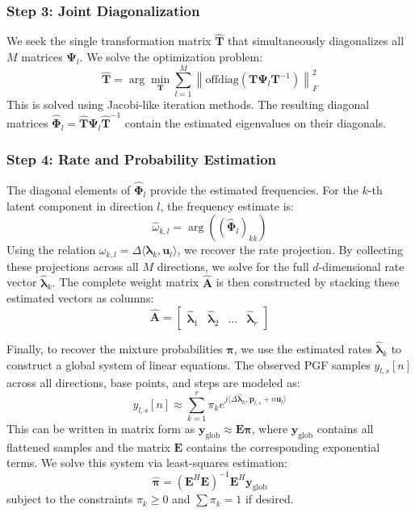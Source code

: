 \subsubsection{Step 3: Joint Diagonalization}
We seek the single transformation matrix $\hat{\mathbf{T}}$ that simultaneously diagonalizes all $M$ matrices $\mathbf{\Psi}_l$. We solve the optimization problem:
$$ \hat{\mathbf{T}} = \arg\min_{\mathbf{T}} \sum_{l=1}^M \left\| \text{offdiag}(\mathbf{T} \mathbf{\Psi}_l \mathbf{T}^{-1}) \right\|_F^2 $$
This is solved using Jacobi-like iteration methods. The resulting diagonal matrices $\hat{\mathbf{\Phi}}_l = \hat{\mathbf{T}} \mathbf{\Psi}_l \hat{\mathbf{T}}^{-1}$ contain the estimated eigenvalues on their diagonals.

\subsubsection{Step 4: Rate and Probability Estimation}
The diagonal elements of $\hat{\mathbf{\Phi}}_l$ provide the estimated frequencies. For the $k$-th latent component in direction $l$, the frequency estimate is:
$$ \hat{\omega}_{k,l} = \arg( (\hat{\mathbf{\Phi}}_l)_{kk} ) $$
Using the relation $\omega_{k,l} = \Delta \langle \boldsymbol{\lambda}_k, \mathbf{u}_l \rangle$, we recover the rate projection. By collecting these projections across all $M$ directions, we solve for the full $d$-dimensional rate vector $\hat{\boldsymbol{\lambda}}_k$.
The complete weight matrix $\hat{\mathbf{A}}$ is then constructed by stacking these estimated vectors as columns:
$$ \hat{\mathbf{A}} = \begin{bmatrix} \hat{\boldsymbol{\lambda}}_1 & \hat{\boldsymbol{\lambda}}_2 & \dots & \hat{\boldsymbol{\lambda}}_r \end{bmatrix} $$

Finally, to recover the mixture probabilities $\boldsymbol{\pi}$, we use the estimated rates $\hat{\boldsymbol{\lambda}}_k$ to construct a global system of linear equations. The observed PGF samples $y_{l,s}[n]$ across all directions, base points, and steps are modeled as:
$$ y_{l,s}[n] \approx \sum_{k=1}^r \pi_k e^{j \langle \Delta \hat{\boldsymbol{\lambda}}_k, \mathbf{p}_{l,s} + n \mathbf{u}_l \rangle} $$
This can be written in matrix form as $\mathbf{y}_{\text{glob}} \approx \mathbf{E} \boldsymbol{\pi}$, where $\mathbf{y}_{\text{glob}}$ contains all flattened samples and the matrix $\mathbf{E}$ contains the corresponding exponential terms. We solve this system via least-squares estimation:
$$ \hat{\boldsymbol{\pi}} = (\mathbf{E}^H \mathbf{E})^{-1} \mathbf{E}^H \mathbf{y}_{\text{glob}} $$
subject to the constraints $\pi_k \ge 0$ and $\sum \pi_k = 1$ if desired.

